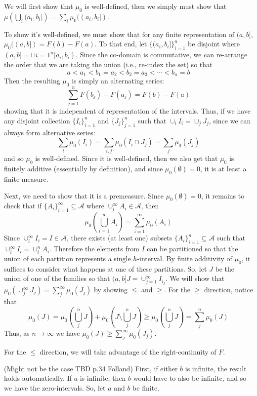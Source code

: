 \documentclass[oneside]{book}
\newcommand{\Dcup}{\sqcup}
\newcommand{\CA}{\mathcal{A}}
\newcommand{\sse}{\subseteq}
\newcommand{\rw}{\rightarrow}
\begin{document}
\begin{Proof}
	We will first show that $\mu_0$ is well-defined, then we simply must show that $\mu\left(\bigcup_i (a_i, b_i]\right)
	= \sum_i \mu_0((a_i, b_i])$. 

	To show it's well-defined, we must show that for any finite representation of $(a,b]$, $\mu_0((a,b]) = F(b) - F(a)$.
	To that end, let $\{(a_i, b_i]\}_{i=1}^n$ be disjoint where $(a,b] = \Dcup{i=1}^n [a_i, b_i)$. Since the co-domain
	is commutative, we can re-arrange the order that we are taking the union (i.e., re-index the set) so that
	\[
		a < a_1 < b_1 = a_2 < b_2 = a_3 < \cdots < b_n = b
	\]
	Then the resulting $\mu_0$ is simply an alternating series:
	\[
		\sum_{j=1}^n F(b_j) - F(a_j) = F(b) - F(a)
	\]
	showing that it is independent of representation of the intervals. Thus, if we have any disjoint collection $\{I_i\}_{i=1}^n$
	and $\{J_j\}_{j=1}^n$ such that $\cup_i I_i = \cup_j J_j$, since we can always form alternative series:
	\[
		\sum_i \mu_0(I_i) = \sum_{i,j} \mu_0(I_i\cap J_j) = \sum_j \mu_0(J_j)
	\]
	and so $\mu_0$ is well-defined. Since it is well-defined, then we also get that $\mu_0$ is finitely additive
	(essentially by definition), and since $\mu_0(\emptyset) = 0$, it is at least a finite measure. 

	Next, we need to show that it is a premeasure. Since $\mu_0(\emptyset) = 0$, it remains to check that if
	$\{A_i\}_{i=1}^\infty \sse \CA$ where $\cup_i^\infty A_i \in \CA$, then
	\[
		\mu_0\left(\bigcup_{i=1}^\infty A_i\right) = \sum_{i=1}^\infty \mu_0(A_i)
	\]
	Since $\cup_i^\infty I_i = I \in \CA$, there exists (at least one) subsets $\{A_i\}_{i=1}^n \sse \CA$ such that
	$\cup_i^\infty I_i = \cup_i^n A_i$. Therefore the elements from $I$ can be partitioned so that the union of each
	partition represents a single $h$-interval. By finite additivity of $\mu_0$, it suffices to consider what happens at
	one of these partitions. So, let $J$ be the union of one of the families so that $(a,b] J = \cup_{j=1}^\infty
	I_{i_j}$. We will show that $\mu_0(\cup_j^\infty J_j) = \sum_j^\infty\mu_0(J_j)$ by showing $\le$ and $\ge$. For the
	$\ge$ direction, notice that 
	\[
		\mu_0(J) = \mu_0\left(\bigcup_j^n J\right) + \mu_0\left(J \setminus \bigcup_j^n J\right) \ge
		\mu_0\left(\bigcup_j^n J\right) = \sum_j^n \mu_0\left(J\right) 
	\]
	Thus, as $n \rw \infty$ we have $\mu_0(J) \ge \sum_j^\infty \mu_0(J_j)$. 

	For the $\le$ direction, we will take advantage of the right-continuity of $F$. 

	(Might not be the case TBD p.34 Folland) First, if either $b$ is infinite,
	the result holds automatically. If $a$ is infinite, then $b$ would have to also be infinite, and so we have the
	zero-intervals. So, let $a$ and $b$ be finite. 


\end{Proof}
\end{document}
